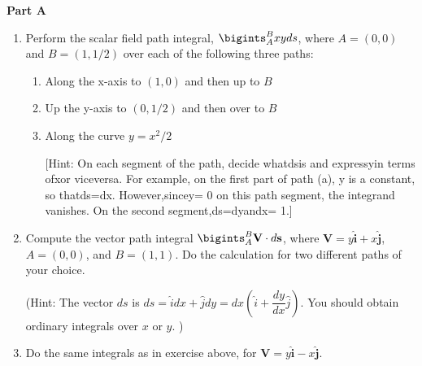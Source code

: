 \documentclass[fleqn]{article}
\begin{document}
  \textbf{Part A}
  \begin{enumerate}
    \item  Perform the scalar field path integral, $\bigints_A^B xy ds$, where $A=(0,0)$ and $B=(1,1/2)$ over each of the following three paths:
      \begin{enumerate}
      \item Along the x-axis to $(1, 0)$ and then up to $B$
      \item Up the y-axis to $(0, 1/2)$ and then over to $B$

      \item Along the curve $y = x^2/2$ 

      [Hint:  On each segment of the path,  decide whatdsis and expressyin terms ofxor viceversa.  
      For example, on the first part of path (a), y is a constant, so thatds=dx.  
      However,sincey= 0 on this path segment, the integrand vanishes.  On the second segment,ds=dyandx= 1.]
      \end{enumerate}

    \item Compute the vector path integral $\bigints_A^B \mathbf{V}\cdot d\mathbf{s}$, where $\mathbf{V}=y \mathbf{\hat i} + x \mathbf{\hat j}$, $A=(0,0)$, and $B=(1,1)$. Do the calculation for two different paths of your choice.

    (Hint:  The vector $ds$ is $ds=\hat{i}dx+\hat{j}dy=dx(\hat{i}+\dfrac{dy}{dx} \hat{j})$.  
    You should obtain ordinary integrals over $x$ or $y$.  )

    \item Do the same integrals as in exercise above, for $\mathbf{V}=y \mathbf{\hat i} - x \mathbf{\hat j}$. 

  \end{enumerate}
\end{document}
